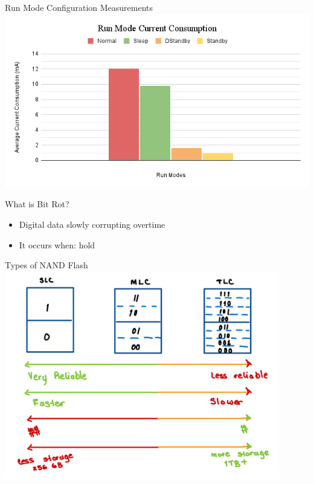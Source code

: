 \begin{frame}{Run Mode Configuration Measurements}
    \centering
    \includegraphics[height=0.8\textheight,width=1.0\textwidth,keepaspectratio]{images/run_modes.png}
\end{frame}

\begin{frame}{What is Bit Rot?}
    \begin{itemize}
        \item Digital data slowly corrupting overtime
        \item It occurs when: hold
    \end{itemize}
    \centering
\end{frame}

\begin{frame}{Types of NAND Flash}
    \centering
    \includegraphics[height=0.9\textheight,width=0.9\textwidth,keepaspectratio]{images/flash_types.png}
\end{frame}

